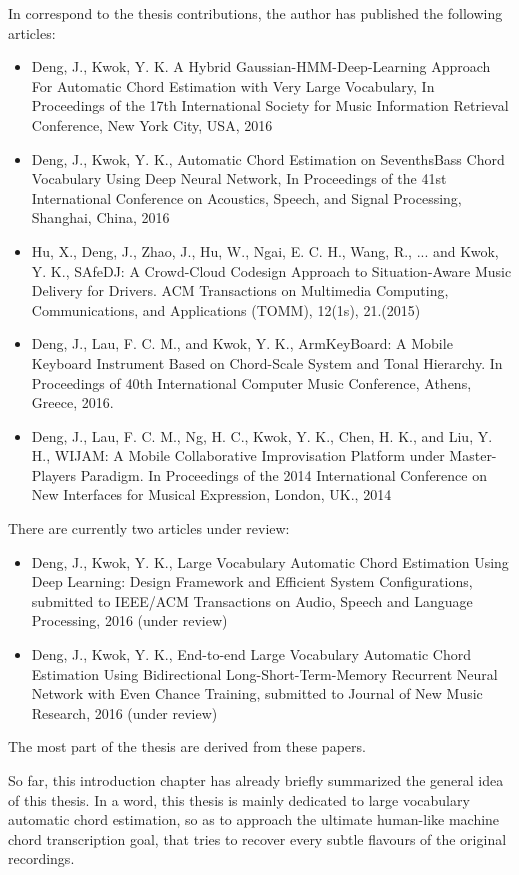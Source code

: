 In correspond to the thesis contributions, the author has published the following articles:
\begin{itemize}
\item Deng, J., Kwok, Y. K. A Hybrid Gaussian-HMM-Deep-Learning Approach For Automatic Chord Estimation with Very Large Vocabulary, In Proceedings of the 17th International Society for Music Information Retrieval Conference, New York City, USA, 2016
\item Deng, J., Kwok, Y. K., Automatic Chord Estimation on SeventhsBass Chord Vocabulary Using Deep Neural Network, In Proceedings of the 41st International Conference on Acoustics, Speech, and Signal Processing, Shanghai, China, 2016
\item Hu, X., Deng, J., Zhao, J., Hu, W., Ngai, E. C. H., Wang, R., ... and Kwok, Y. K., SAfeDJ: A Crowd-Cloud Codesign Approach to Situation-Aware Music Delivery for Drivers. ACM Transactions on Multimedia Computing, Communications, and Applications (TOMM), 12(1s), 21.(2015)
\item Deng, J., Lau, F. C. M., and Kwok, Y. K., ArmKeyBoard: A Mobile Keyboard Instrument Based on Chord-Scale System and Tonal Hierarchy. In Proceedings of 40th International Computer Music Conference, Athens, Greece, 2016.
\item Deng, J., Lau, F. C. M., Ng, H. C., Kwok, Y. K., Chen, H. K., and Liu, Y. H., WIJAM: A Mobile Collaborative Improvisation Platform under Master-Players Paradigm. In Proceedings of the 2014 International Conference on New Interfaces for Musical Expression, London, UK., 2014
\end{itemize}

There are currently two articles under review:
\begin{itemize}
\item Deng, J., Kwok, Y. K., Large Vocabulary Automatic Chord Estimation Using Deep Learning: Design Framework and Efficient System Configurations, submitted to IEEE/ACM Transactions on Audio, Speech and Language Processing, 2016 (under review)
\item Deng, J., Kwok, Y. K., End-to-end Large Vocabulary Automatic Chord Estimation Using Bidirectional Long-Short-Term-Memory Recurrent Neural Network with Even Chance Training, submitted to Journal of New Music Research, 2016 (under review)
\end{itemize}
The most part of the thesis are derived from these papers.

So far, this introduction chapter has already briefly summarized the general idea of this thesis. In a word, this thesis is mainly dedicated to large vocabulary automatic chord estimation, so as to approach the ultimate human-like machine chord transcription goal, that tries to recover every subtle flavours of the original recordings.

